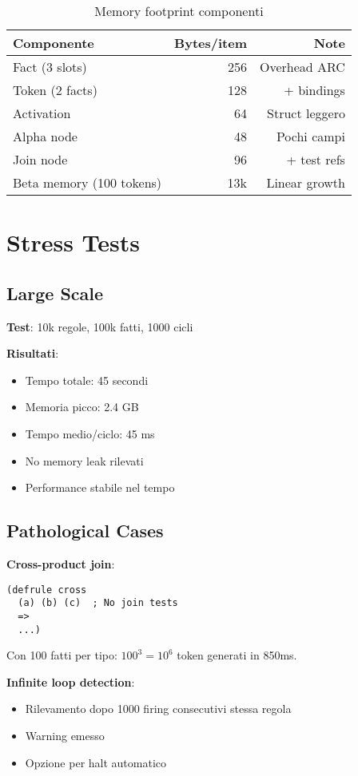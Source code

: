 \begin{table}[h]
\centering
\begin{tabular}{@{}lrr@{}}
\toprule
\textbf{Componente} & \textbf{Bytes/item} & \textbf{Note} \\
\midrule
Fact (3 slots) & 256 & Overhead ARC \\
Token (2 facts) & 128 & + bindings \\
Activation & 64 & Struct leggero \\
Alpha node & 48 & Pochi campi \\
Join node & 96 & + test refs \\
Beta memory (100 tokens) & 13k & Linear growth \\
\bottomrule
\end{tabular}
\caption{Memory footprint componenti}
\end{table}

\section{Stress Tests}

\subsection{Large Scale}

\textbf{Test}: 10k regole, 100k fatti, 1000 cicli

\textbf{Risultati}:
\begin{itemize}
\item Tempo totale: 45 secondi
\item Memoria picco: 2.4 GB
\item Tempo medio/ciclo: 45 ms
\item No memory leak rilevati
\item Performance stabile nel tempo
\end{itemize}

\subsection{Pathological Cases}

\textbf{Cross-product join}:
\begin{lstlisting}[language=CLIPS]
(defrule cross
  (a) (b) (c)  ; No join tests
  =>
  ...)
\end{lstlisting}

Con 100 fatti per tipo: $100^3 = 10^6$ token generati in 850ms.

\textbf{Infinite loop detection}:
\begin{itemize}
\item Rilevamento dopo 1000 firing consecutivi stessa regola
\item Warning emesso
\item Opzione per halt automatico
\end{itemize}

